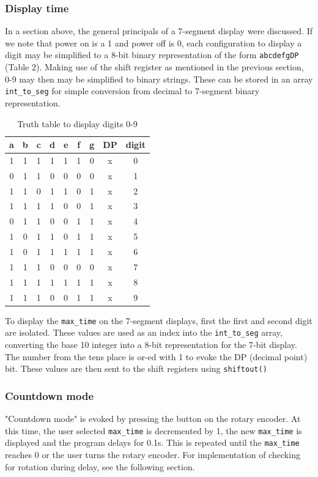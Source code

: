 \documentclass[fleqn]{article}
\begin{document}
\subsubsection*{Display time}
In a section above, the general principals of a 7-segment display were discussed. If we note that power on is a 1 and power off is 0, each configuration to display a digit may be simplified to a 8-bit binary representation of the form \verb|abcdefgDP| (Table 2). Making use of the shift register as mentioned in the previous section, 0-9 may then may be simplified to binary strings. These can be stored in an array \verb|int_to_seg| for simple conversion from decimal to 7-segment binary representation.
\begin{table}[H]
    \centering
    \setlength{\tabcolsep}{15pt}
    \begin{tabular}{cccccccc|c}
    \textbf{a} & \textbf{b} & \textbf{c} & \textbf{d} & \textbf{e} & \textbf{f} & \textbf{g} & \textbf{DP} & \textbf{digit} \\ \hline
    1 & 1 & 1 & 1 & 1 & 1 & 0 & x & 0 \\ \hline
    0 & 1 & 1 & 0 & 0 & 0 & 0 & x & 1 \\ \hline
    1 & 1 & 0 & 1 & 1 & 0 & 1 & x & 2 \\ \hline
    1 & 1 & 1 & 1 & 0 & 0 & 1 & x & 3 \\ \hline
    0 & 1 & 1 & 0 & 0 & 1 & 1 & x & 4 \\ \hline
    1 & 0 & 1 & 1 & 0 & 1 & 1 & x & 5 \\ \hline
    1 & 0 & 1 & 1 & 1 & 1 & 1 & x & 6 \\ \hline
    1 & 1 & 1 & 0 & 0 & 0 & 0 & x & 7 \\ \hline
    1 & 1 & 1 & 1 & 1 & 1 & 1 & x & 8 \\ \hline
    1 & 1 & 1 & 0 & 0 & 1 & 1 & x & 9 \\
    \end{tabular}
    \caption{Truth table to display digits 0-9}
\end{table}

To display the \verb|max_time| on the 7-segment displays, first the first and second digit are isolated. These values are used as an index into the \verb|int_to_seg| array, converting the base 10 integer into a 8-bit representation for the 7-bit display. The number from the tens place is or-ed with 1 to evoke the DP (decimal point) bit. These values are then sent to the shift registers using \verb|shiftout()|

\subsubsection*{Countdown mode}
"Countdown mode" is evoked by pressing the button on the rotary encoder. At this time, the user selected \verb|max_time| is decremented by 1, the new \verb|max_time| is displayed and the program delays for 0.1s. This is repeated until the \verb|max_time| reaches 0 or the user turns the rotary encoder. For implementation of checking for rotation during delay, see the following section. 
\end{document}
